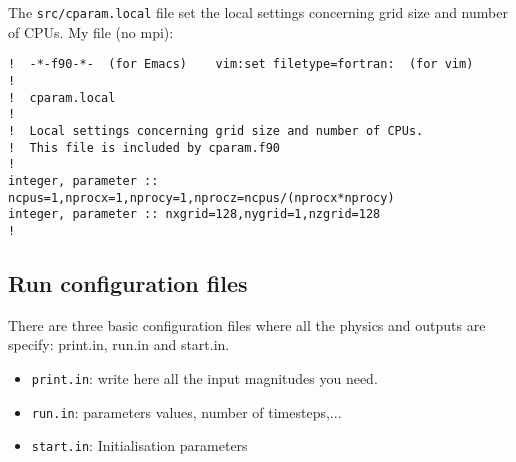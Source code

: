\documentclass[a4paper,12pt]{article}
\begin{document}
The \texttt{src/cparam.local} file set the local settings concerning grid size
and number of CPUs. My file (no mpi):
\begin{verbatim}
!  -*-f90-*-  (for Emacs)    vim:set filetype=fortran:  (for vim)
!
!  cparam.local
!
!  Local settings concerning grid size and number of CPUs.
!  This file is included by cparam.f90
!
integer, parameter :: ncpus=1,nprocx=1,nprocy=1,nprocz=ncpus/(nprocx*nprocy)
integer, parameter :: nxgrid=128,nygrid=1,nzgrid=128
!
\end{verbatim}

\subsection{Run configuration files}

There are three basic configuration files where all the physics and outputs are specify: print.in, run.in and start.in.
\begin{itemize}
 \item \verb|print.in|: write here all the input magnitudes you need.
  \item \verb|run.in|: parameters values, number of timesteps,...
  \item \verb|start.in|: Initialisation parameters
\end{itemize}



%
%

    
\end{document}
